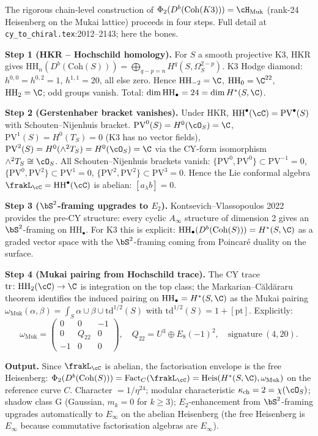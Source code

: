\documentclass[11pt]{article}
\theoremstyle{definition}
\providecommand{\HH}{\mathrm{HH}}
\providecommand{\Ainf}{A_\infty}
\providecommand{\Coh}{\mathrm{Coh}}
\providecommand{\Fact}{\mathrm{Fact}}
\providecommand{\kch}{\kappa_{\mathrm{ch}}}
\providecommand{\PV}{\mathrm{PV}}
\begin{document}
\noindent The rigorous chain-level construction of
$\Phi_2(D^b(\Coh(K3))) = \cH_{\mathrm{Muk}}$ (rank-24 Heisenberg on the
Mukai lattice) proceeds in four steps. Full detail at
\texttt{cy\_to\_chiral.tex}:2012--2143; here the bones.

\smallskip
\textbf{Step 1 (HKR -- Hochschild homology).} For $S$ a smooth
projective K3, HKR gives
$\HH_n(D^b(\Coh(S))) = \bigoplus_{q - p = n} H^q(S, \Omega^{2-p}_S)$.
K3 Hodge diamond: $h^{0,0} = h^{0,2} = 1$, $h^{1,1} = 20$, all else
zero. Hence $\HH_{-2} = \C$, $\HH_0 = \C^{22}$, $\HH_2 = \C$; odd
groups vanish. Total: $\dim \HH_\bullet = 24 = \dim H^*(S, \C)$.

\textbf{Step 2 (Gerstenhaber bracket vanishes).} Under HKR,
$\HH^\bullet(\cC) = \PV^\bullet(S)$ with Schouten--Nijenhuis bracket.
$\PV^0(S) = H^0(\cO_S) = \C$, $\PV^1(S) = H^0(T_S) = 0$ (K3 has no
vector fields), $\PV^2(S) = H^0(\wedge^2 T_S) = H^0(\cO_S) = \C$ via
the CY-form isomorphism $\wedge^2 T_S \cong \cO_S$. All
Schouten--Nijenhuis brackets vanish: $\{\PV^0, \PV^0\} \subset \PV^{-1} = 0$,
$\{\PV^0, \PV^2\} \subset \PV^1 = 0$, $\{\PV^2, \PV^2\} \subset \PV^3 = 0$.
Hence the Lie conformal algebra $\frakL_\cC = \HH^\bullet(\cC)$ is
abelian: $[a_\lambda b] = 0$.

\textbf{Step 3 ($\bS^2$-framing upgrades to $E_2$).} Kontsevich--Vlassopoulos
2022 provides the pre-CY structure: every cyclic $\Ainf$ structure of
dimension 2 gives an $\bS^2$-framing on $\HH_\bullet$. For K3 this is
explicit: $\HH_\bullet(D^b(\Coh(S))) = H^*(S, \C)$ as a graded
vector space with the $\bS^2$-framing coming from Poincar\'e
duality on the surface.

\textbf{Step 4 (Mukai pairing from Hochschild trace).} The CY trace
$\mathrm{tr}\colon \HH_2(\cC) \to \C$ is integration on the top class;
the Markarian--C\u{a}ld\u{a}raru theorem identifies the induced
pairing on $\HH_\bullet = H^*(S, \C)$ as the Mukai pairing
$\omega_{\mathrm{Muk}}(\alpha, \beta) = \int_S \alpha \cup \beta \cup \mathrm{td}^{1/2}(S)$
with $\mathrm{td}^{1/2}(S) = 1 + [\mathrm{pt}]$. Explicitly:
\[
 \omega_{\mathrm{Muk}} = \begin{pmatrix} 0 & 0 & -1 \\ 0 & Q_{22} & 0 \\ -1 & 0 & 0 \end{pmatrix},
 \quad Q_{22} = U^3 \oplus E_8(-1)^2, \quad \text{signature}\ (4, 20).
\]

\textbf{Output.} Since $\frakL_\cC$ is abelian, the factorisation
envelope is the free Heisenberg: $\Phi_2(D^b(\Coh(S))) = \Fact_C(\frakL_\cC) = \mathrm{Heis}(H^*(S, \C), \omega_{\mathrm{Muk}})$
on the reference curve $C$. Character $= 1/\eta^{24}$; modular
characteristic $\kch = 2 = \chi(\cO_S)$; shadow class $\mathrm G$
(Gaussian, $m_k = 0$ for $k \geq 3$); $E_2$-enhancement from
$\bS^2$-framing upgrades automatically to $E_\infty$ on the abelian
Heisenberg (the free Heisenberg is $E_\infty$ because commutative
factorisation algebras are $E_\infty$).
\end{document}

